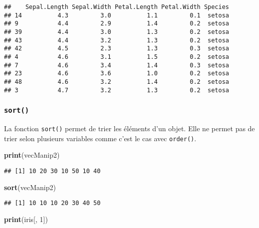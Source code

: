 \documentclass[]{book}
\newenvironment{Shaded}{\begin{snugshade}}{\end{snugshade}}
\newcommand{\KeywordTok}[1]{\textcolor[rgb]{0.13,0.29,0.53}{\textbf{#1}}}
\newcommand{\DecValTok}[1]{\textcolor[rgb]{0.00,0.00,0.81}{#1}}
\newcommand{\NormalTok}[1]{#1}
\theoremstyle{definition}
\theoremstyle{definition}
\theoremstyle{definition}
\theoremstyle{remark}
\begin{document}
\begin{verbatim}
##    Sepal.Length Sepal.Width Petal.Length Petal.Width Species
## 14          4.3         3.0          1.1         0.1  setosa
## 9           4.4         2.9          1.4         0.2  setosa
## 39          4.4         3.0          1.3         0.2  setosa
## 43          4.4         3.2          1.3         0.2  setosa
## 42          4.5         2.3          1.3         0.3  setosa
## 4           4.6         3.1          1.5         0.2  setosa
## 7           4.6         3.4          1.4         0.3  setosa
## 23          4.6         3.6          1.0         0.2  setosa
## 48          4.6         3.2          1.4         0.2  setosa
## 3           4.7         3.2          1.3         0.2  setosa
\end{verbatim}

\subsubsection{\texorpdfstring{\texttt{sort()}}{sort()}}\label{l015sort}

La fonction \texttt{sort()} permet de trier les éléments d'un objet.
Elle ne permet pas de trier selon plusieurs variables comme c'est le cas
avec \texttt{order()}.

\begin{Shaded}
\begin{Highlighting}[]
\KeywordTok{print}\NormalTok{(vecManip2)}
\end{Highlighting}
\end{Shaded}

\begin{verbatim}
## [1] 10 20 30 10 50 10 40
\end{verbatim}

\begin{Shaded}
\begin{Highlighting}[]
\KeywordTok{sort}\NormalTok{(vecManip2)}
\end{Highlighting}
\end{Shaded}

\begin{verbatim}
## [1] 10 10 10 20 30 40 50
\end{verbatim}

\begin{Shaded}
\begin{Highlighting}[]
\KeywordTok{print}\NormalTok{(iris[, }\DecValTok{1}\NormalTok{])}
\end{Highlighting}
\end{Shaded}
\end{document}
